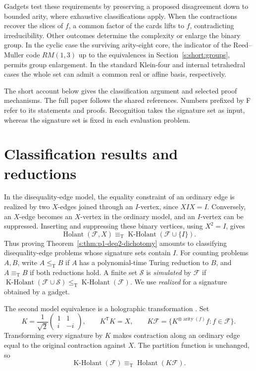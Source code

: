 \documentclass[11pt,letterpaper,onecolumn]{article}
\theoremstyle{plain}
\theoremstyle{definition}
\theoremstyle{remark}
\newcommand{\cF}{\mathcal F}
\newcommand{\cS}{\mathcal S}
\newcommand{\Holant}{\operatorname{Holant}}
\newcommand{\KHolant}{\operatorname{K\text{-}Holant}}
\newcommand{\arity}{\operatorname{arity}}
\newcommand{\leT}{\leq_{\mathrm T}}
\newcommand{\equivT}{\equiv_{\mathrm T}}
\begin{document}
Gadgets test these requirements by preserving a proposed disagreement down to
bounded arity, where exhaustive classifications apply. When the
contractions recover the slices of \(f\), a common factor of the cards
lifts to \(f\), contradicting irreducibility. Other outcomes determine
the complexity or enlarge the binary group. In the cyclic case the
surviving arity-eight core, the indicator of the Reed--Muller code
\(RM(1,3)\) up to the equivalences in Section~\ref{s:short:groups}, permits
group enlargement. In the standard Klein-four
and internal tetrahedral cases the whole set can admit a common real
or affine basis, respectively.

The short account below gives the classification argument and selected
proof mechanisms. The full paper follows the shared references. Numbers prefixed by F refer to its statements and proofs. Recognition takes the signature
set as input, whereas the signature set is fixed in each evaluation problem.

\section{Classification results and reductions}
\label{s:short:tools}
In the disequality-edge model, the equality constraint of an ordinary edge is realized
by two \(X\)-edges joined through an \(I\)-vertex, since \(XIX=I\).
Conversely, an \(X\)-edge becomes an \(X\)-vertex in the ordinary model,
and an \(I\)-vertex can be suppressed. Inserting and suppressing these
binary vertices, using \(X^2=I\), gives
\[
 \Holant(\cF,X)\equivT\KHolant(\cF\cup\{I\}).
\]
Thus proving Theorem~\ref{s:thm:p1-deq2-dichotomy} amounts to classifying
disequality-edge problems whose signature sets contain \(I\).
For counting problems \(A,B\), write \(A\leT B\) if \(A\) has a
polynomial-time Turing reduction to \(B\), and \(A\equivT B\) if both
reductions hold. A finite set \(\cS\) is \emph{simulated} by
\(\cF\) if \(\KHolant(\cF\cup\cS)\leT\KHolant(\cF)\).
We use \emph{realized} for a signature obtained by a gadget.

The second model equivalence is a holographic transformation
\cite{Valiant2008}. Set
\[
 K=\frac1{\sqrt2}\begin{pmatrix}1&1\\i&-i\end{pmatrix},
 \qquad K^{\mathsf T}K=X,
 \qquad K\cF=\{K^{\otimes\arity(f)}f:f\in\cF\}.
\]
Transforming every signature by \(K\) makes contraction along an ordinary
edge equal to the original contraction against \(X\). The partition
function is unchanged, so
\[
 \KHolant(\cF)\equivT\Holant(K\cF).
\]
\end{document}
